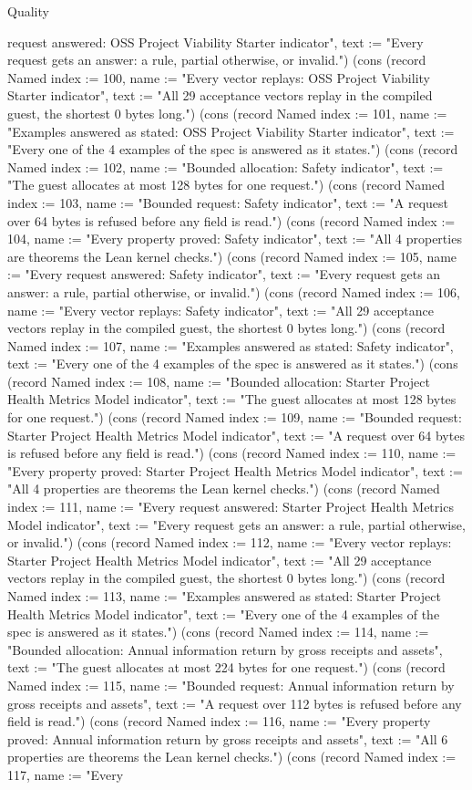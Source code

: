 \begin{lexlean}{Quality}
\begin{semanticmodule}
{request answered: OSS Project Viability Starter indicator", text := "Every request gets an answer: a rule, partial otherwise, or invalid."}) (cons (record Named {index := 100, name := "Every vector replays: OSS Project Viability Starter indicator", text := "All 29 acceptance vectors replay in the compiled guest, the shortest 0 bytes long."}) (cons (record Named {index := 101, name := "Examples answered as stated: OSS Project Viability Starter indicator", text := "Every one of the 4 examples of the spec is answered as it states."}) (cons (record Named {index := 102, name := "Bounded allocation: Safety indicator", text := "The guest allocates at most 128 bytes for one request."}) (cons (record Named {index := 103, name := "Bounded request: Safety indicator", text := "A request over 64 bytes is refused before any field is read."}) (cons (record Named {index := 104, name := "Every property proved: Safety indicator", text := "All 4 properties are theorems the Lean kernel checks."}) (cons (record Named {index := 105, name := "Every request answered: Safety indicator", text := "Every request gets an answer: a rule, partial otherwise, or invalid."}) (cons (record Named {index := 106, name := "Every vector replays: Safety indicator", text := "All 29 acceptance vectors replay in the compiled guest, the shortest 0 bytes long."}) (cons (record Named {index := 107, name := "Examples answered as stated: Safety indicator", text := "Every one of the 4 examples of the spec is answered as it states."}) (cons (record Named {index := 108, name := "Bounded allocation: Starter Project Health Metrics Model indicator", text := "The guest allocates at most 128 bytes for one request."}) (cons (record Named {index := 109, name := "Bounded request: Starter Project Health Metrics Model indicator", text := "A request over 64 bytes is refused before any field is read."}) (cons (record Named {index := 110, name := "Every property proved: Starter Project Health Metrics Model indicator", text := "All 4 properties are theorems the Lean kernel checks."}) (cons (record Named {index := 111, name := "Every request answered: Starter Project Health Metrics Model indicator", text := "Every request gets an answer: a rule, partial otherwise, or invalid."}) (cons (record Named {index := 112, name := "Every vector replays: Starter Project Health Metrics Model indicator", text := "All 29 acceptance vectors replay in the compiled guest, the shortest 0 bytes long."}) (cons (record Named {index := 113, name := "Examples answered as stated: Starter Project Health Metrics Model indicator", text := "Every one of the 4 examples of the spec is answered as it states."}) (cons (record Named {index := 114, name := "Bounded allocation: Annual information return by gross receipts and assets", text := "The guest allocates at most 224 bytes for one request."}) (cons (record Named {index := 115, name := "Bounded request: Annual information return by gross receipts and assets", text := "A request over 112 bytes is refused before any field is read."}) (cons (record Named {index := 116, name := "Every property proved: Annual information return by gross receipts and assets", text := "All 6 properties are theorems the Lean kernel checks."}) (cons (record Named {index := 117, name := "Every }
\end{semanticmodule}
\end{lexlean}

